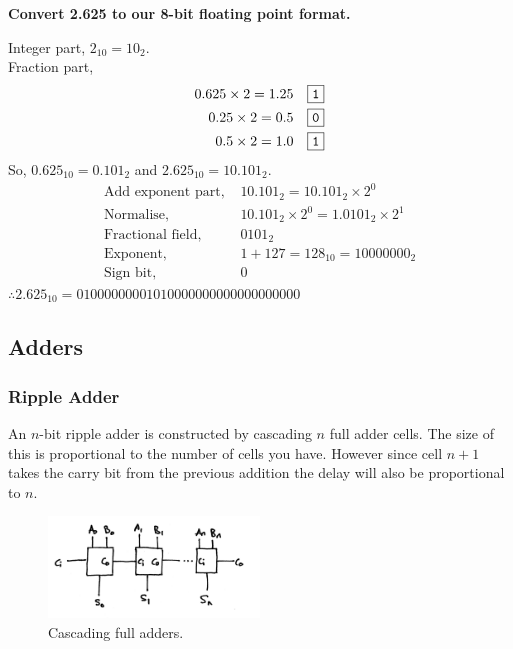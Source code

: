 \begin{framed}
\textbf{Convert 2.625 to our 8-bit floating point format.} \\ \par
Integer part, $2_{10}=10_{2}$. \\
Fraction part, 
\begin{align*}
    0.625\times 2=1.25 \quad \boxed{\mbox{\texttt{1}}} \\
    0.25\times 2=0.5 \quad \boxed{\mbox{\texttt{0}}} \\
    0.5\times 2=1.0 \quad \boxed{\mbox{\texttt{1}}}
\end{align*}
So, $0.625_{10}=0.101_2$ and $2.625_{10}=10.101_2$.
\begin{align*}
    \mbox{Add exponent part, } & 10.101_2 = 10.101_2 \times 2^0 \\
    \mbox{Normalise, } & 10.101_2 \times 2^0 = 1.0101_2 \times 2^1 \\
    \mbox{Fractional field, } & 0101_2 \\
    \mbox{Exponent, } & 1+127=128_{10}=10000000_{2} \\
    \mbox{Sign bit, } & 0
\end{align*}
$\therefore 2.625_{10} = \boxed{0}\boxed{10000000}\boxed{01010000000000000000000}$
\end{framed}

\subsection{Adders}
\subsubsection{Ripple Adder}
An $n$-bit ripple adder is constructed by cascading $n$ full adder cells. The size of this is proportional to the number of cells you have. However since cell $n+1$ takes the carry bit from the previous addition the delay will also be proportional to $n$.

\begin{figure}[H]
    \centering
    \includegraphics[width=0.5\textwidth]{img/ripple-adder}
    \caption{Cascading full adders.}
\end{figure}

